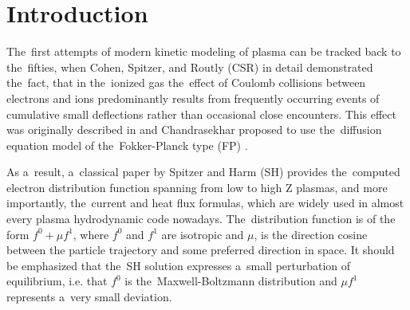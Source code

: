\section{Introduction}
\label{sec:Intro}

The~first attempts of modern kinetic modeling of plasma can be tracked back 
to the~fifties, when Cohen, Spitzer, and Routly (CSR) \cite{CSR_1950} 
in detail demonstrated the~fact, that in the~ionized gas the~effect of 
Coulomb collisions between electrons and ions predominantly results 
from frequently occurring events of cumulative small deflections 
rather than occasional close encounters. This effect was originally described
in \cite{Jeans_BOOK1929} and Chandrasekhar \cite{Chandrasekhar_RMP1943} 
proposed to use the~diffusion equation model of the~Fokker-Planck type (FP) 
\cite{Planck_1917}.

As a~result, a~classical paper by Spitzer and Harm (SH) 
\cite{SpitzerHarm_PR1953} provides the~computed electron distribution function
spanning from low to high Z plasmas, and more importantly, the~current and 
heat flux formulas, which are widely used in almost every plasma hydrodynamic
code nowadays.
The~distribution function is of the form $f^0+\mu f^1$, where $f^0$ and $f^1$ 
are isotropic and $\mu$, is the direction cosine between the particle 
trajectory and some preferred direction in space. It should be emphasized that
the~SH solution expresses a~small perturbation of equilibrium, i.e. that 
$f^0$ is the~Maxwell-Boltzmann distribution and $\mu f^1$ represents 
a~very small deviation.

